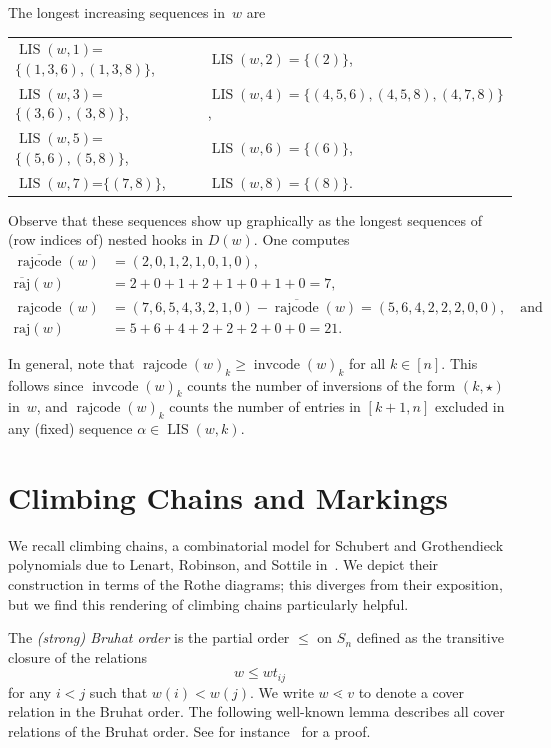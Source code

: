 \documentclass[ALCO]{cedram}
\newcommand{\absrajcode}[1]{\mathrm{raj}(#1)}
\newcommand{\absoverrajcode}[1]{\overline{\mathrm{raj}}(#1)}
\DeclareMathOperator{\LIS}{\mathrm{LIS}}
\DeclareMathOperator{\cc}{\mathrm{invcode}}
\DeclareMathOperator{\rr}{\mathrm{rajcode}}
\newcommand{\orr}{\overline{\rr}}
\begin{document}
\begin{example}
\begin{center}
	\end{center}
	The longest increasing sequences in~$w$ are
	\begin{center}
		\begin{tabular}{lcl}
			$\LIS(w,1)$=$\{(1, 3, 6),(1, 3, 8) \}$,&\phantom{aaaa}&$\LIS(w,2)=\{(2)\}$,\\
			$\LIS(w,3)$=$\{(3, 6),(3, 8)\}$,&\phantom{aaaa}&$\LIS(w,4)=\{(4, 5, 6),(4, 5, 8),(4, 7, 8)\}$,\\
			$\LIS(w,5)$=$\{(5, 6),(5, 8)\}$,&\phantom{aaaa}&$\LIS(w,6)=\{(6)\}$,\\
			$\LIS(w,7)$=$\{(7,8)\}$,&\phantom{aaaa}&$\LIS(w,8)=\{(8)\}$.
		\end{tabular}
	\end{center}
	Observe that these sequences show up graphically as the longest sequences of (row indices of) nested hooks in $D(w)$.
	One computes
	\begin{align*}
		\orr(w)&=(2,0,1,2,1,0,1,0),\\
		\absoverrajcode{w} &= 2+0+1+2+1+0+1+0 = 7,\\
		\rr(w) &= (7,6,5,4,3,2,1,0)-\orr(w)=(5, 6, 4, 2, 2, 2, 0, 0),\quad \mbox{and}\\
		\absrajcode{w}&=5+6+4+2+2+2+0+0 = 21.
	\end{align*}
\end{example}

In general, note that $\rr(w)_k\geq \cc(w)_k$ for all $k\in [n]$. This follows since $\cc(w)_k$ counts the number of inversions of the form $(k,\star)$ in~$w$, and $\rr(w)_k$ counts the number of entries in $[k+1,n]$ excluded in any (fixed) sequence $\alpha\in \LIS(w,k)$.

\section{Climbing Chains and Markings} 
\label{sec:climb}

We recall climbing chains, a combinatorial model for Schubert and Grothendieck polynomials due to Lenart, Robinson, and Sottile in~\cite{LRS}. We depict their construction in terms of the Rothe diagrams; this diverges from their exposition, but we find this rendering of climbing chains particularly helpful. 

The \emph{(strong) Bruhat order} is the partial order $\leq$ on $S_n$ defined as the transitive closure of the relations 
\[w\leq wt_{ij} \]
for any $i<j$ such that $w(i)<w(j)$.
We write $w\lessdot v$ to denote a cover relation in the Bruhat order. The following well-known lemma describes all cover relations of the Bruhat order. See for instance~\cite[Lemma 2.1.4]{combcoxgroups} for a proof.
\end{document}
